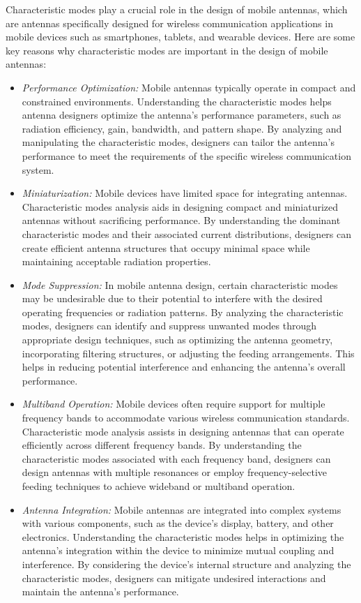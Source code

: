 \documentclass[11pt,a4paper]{article}
\begin{document}
Characteristic modes play a crucial role in the design of mobile antennas, which are antennas specifically designed for wireless communication applications in mobile devices such as smartphones, tablets, and wearable devices. Here are some key reasons why characteristic modes are important in the design of mobile antennas:
\begin{itemize}
    \item \emph{Performance Optimization:} Mobile antennas typically operate in compact and constrained environments. Understanding the characteristic modes helps antenna designers optimize the antenna's performance parameters, such as radiation efficiency, gain, bandwidth, and pattern shape. By analyzing and manipulating the characteristic modes, designers can tailor the antenna's performance to meet the requirements of the specific wireless communication system.
    \item \emph{Miniaturization:} Mobile devices have limited space for integrating antennas. Characteristic modes analysis aids in designing compact and miniaturized antennas without sacrificing performance. By understanding the dominant characteristic modes and their associated current distributions, designers can create efficient antenna structures that occupy minimal space while maintaining acceptable radiation properties.
    \item \emph{Mode Suppression:} In mobile antenna design, certain characteristic modes may be undesirable due to their potential to interfere with the desired operating frequencies or radiation patterns. By analyzing the characteristic modes, designers can identify and suppress unwanted modes through appropriate design techniques, such as optimizing the antenna geometry, incorporating filtering structures, or adjusting the feeding arrangements. This helps in reducing potential interference and enhancing the antenna's overall performance.
    \item \emph{Multiband Operation:} Mobile devices often require support for multiple frequency bands to accommodate various wireless communication standards. Characteristic mode analysis assists in designing antennas that can operate efficiently across different frequency bands. By understanding the characteristic modes associated with each frequency band, designers can design antennas with multiple resonances or employ frequency-selective feeding techniques to achieve wideband or multiband operation.
    \item \emph{Antenna Integration:} Mobile antennas are integrated into complex systems with various components, such as the device's display, battery, and other electronics. Understanding the characteristic modes helps in optimizing the antenna's integration within the device to minimize mutual coupling and interference. By considering the device's internal structure and analyzing the characteristic modes, designers can mitigate undesired interactions and maintain the antenna's performance.
\end{itemize}
\end{document}
